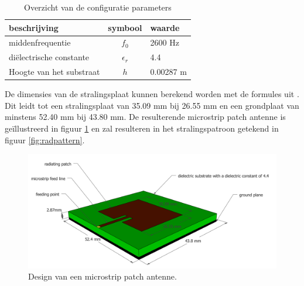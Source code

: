 \documentclass[twocolumn]{phdsymp} %
\begin{document}
\begin{table}[h!]
\centering
\begin{tabular}{|l|c|l|}
\hline
 beschrijving            & symbool          & waarde         \\    \hline
 middenfrequentie      & $f_0$           & 2600 Hz       \\ 
 di\"electrische constante    & $\epsilon_r$    & 4.4         \\ 
 Hoogte van het substraat & $h$             & 0.00287 m    \\ \hline
\end{tabular}
\caption{Overzicht van de configuratie parameters}
\label{table:antennaparas}
\end{table}

De dimensies van de stralingsplaat kunnen berekend worden met de formules uit \cite{J14_antennadesign,J15_antennadesign}.
Dit leidt tot een stralingsplaat van 35.09 mm bij 26.55 mm en  een grondplaat van minstens 52.40 mm bij 43.80 mm.
De resulterende microstrip patch antenne is ge\"illustreerd in figuur \ref{fig:basicpatchantenna} en zal resulteren 
in het stralingspatroon getekend in figuur \ref{fig:radpattern}.
\begin{figure}[h!]
\centering
  \includegraphics[width=\linewidth]{MicrostripAntenna.png}
  \caption{Design van een microstrip patch antenne.}
  \label{fig:basicpatchantenna}
\end{figure}
\end{document}
